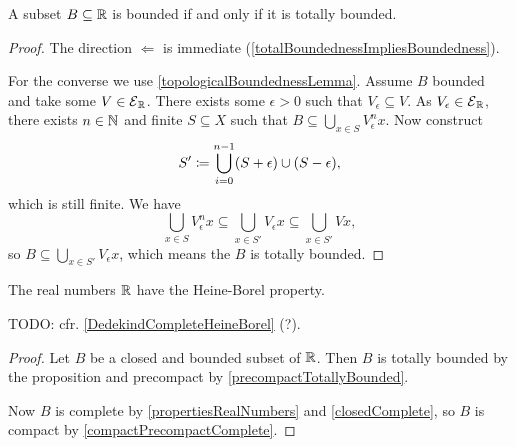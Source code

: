 \begin{proposition} \label{realBoundedIffTotallyBounded}
A subset $B\subseteq \mathbb{R}$ is bounded \textup{if and only if} it is totally bounded.
\end{proposition}
\begin{proof}
The direction $\Leftarrow$ is immediate (\ref{totalBoundednessImpliesBoundedness}).

For the converse we use \ref{topologicalBoundednessLemma}. Assume $B$ bounded and take some $V\in \operatorname{\mathcal{E}}_{\mathbb{R}}$. There exists some $\epsilon >0$ such that $V_\epsilon \subseteq V$. As $V_\epsilon \in \operatorname{\mathcal{E}}_{\mathbb{R}}$, there exists $n\in \mathbb{N}$ and finite $S\subseteq X$ such that $B\subseteq \bigcup_{x\in S}V_\epsilon^nx$.
Now construct
\[ S' \coloneqq \bigcup_{i=0}^{n-1} (S+\epsilon)\cup(S-\epsilon), \]
which is still finite. We have
\[ \bigcup_{x\in S}V_\epsilon^nx\subseteq \bigcup_{x\in S'}V_\epsilon x \subseteq \bigcup_{x\in S'}V x, \]
so $B\subseteq \bigcup_{x\in S'}V_\epsilon x$, which means the $B$ is totally bounded.
\end{proof}
\begin{corollary} \label{HeineBorel}
The real numbers $\mathbb{R}$ have the Heine-Borel property.
\end{corollary}
TODO: cfr. \ref{DedekindCompleteHeineBorel} (?).
\begin{proof}
Let $B$ be a closed and bounded subset of $\mathbb{R}$. Then $B$ is totally bounded by the proposition and precompact by \ref{precompactTotallyBounded}.

Now $B$ is complete by \ref{propertiesRealNumbers} and \ref{closedComplete}, so $B$ is compact by \ref{compactPrecompactComplete}.
\end{proof}


